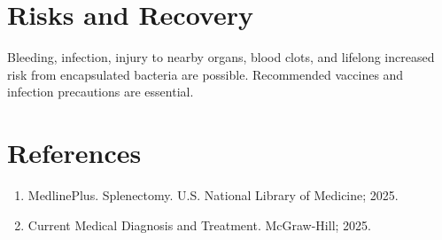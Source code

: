 \section*{Risks and Recovery}
Bleeding, infection, injury to nearby organs, blood clots, and lifelong increased risk from encapsulated bacteria are possible. Recommended vaccines and infection precautions are essential.
\section*{References}
\begin{enumerate}\item MedlinePlus. Splenectomy. U.S. National Library of Medicine; 2025.\item Current Medical Diagnosis and Treatment. McGraw-Hill; 2025.\end{enumerate}
\clearpage
